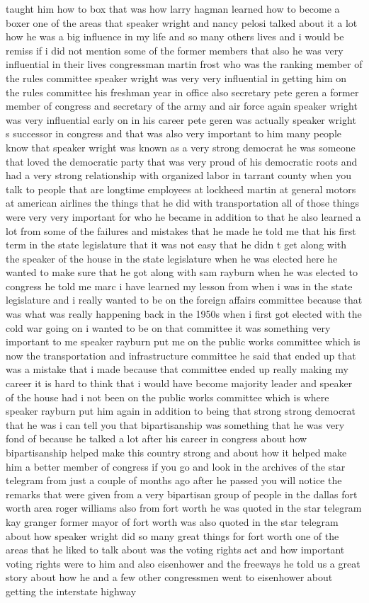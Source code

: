 \documentclass{article}
\begin{document}
taught him how to box that was how larry hagman learned how to become a boxer one of the areas that speaker wright and nancy pelosi talked about it a lot how he was a big influence in my life and so many others lives and i would be remiss if i did not mention some of the former members that also he was very influential in their lives congressman martin frost who was the ranking member of the rules committee speaker wright was very very influential in getting him on the rules committee his freshman year in office also secretary pete geren a former member of congress and secretary of the army and air force again speaker wright was very influential early on in his career pete geren was actually speaker wright s successor in congress and that was also very important to him many people know that speaker wright was known as a very strong democrat he was someone that loved the democratic party that was very proud of his democratic roots and had a very strong relationship with organized labor in tarrant county when you talk to people that are longtime employees at lockheed martin at general motors at american airlines the things that he did with transportation all of those things were very very important for who he became in addition to that he also learned a lot from some of the failures and mistakes that he made he told me that his first term in the state legislature that it was not easy that he didn t get along with the speaker of the house in the state legislature when he was elected here he wanted to make sure that he got along with sam rayburn when he was elected to congress he told me marc i have learned my lesson from when i was in the state legislature and i really wanted to be on the foreign affairs committee because that was what was really happening back in the 1950s when i first got elected with the cold war going on i wanted to be on that committee it was something very important to me speaker rayburn put me on the public works committee which is now the transportation and infrastructure committee he said that ended up that was a mistake that i made because that committee ended up really making my career it is hard to think that i would have become majority leader and speaker of the house had i not been on the public works committee which is where speaker rayburn put him again in addition to being that strong strong democrat that he was i can tell you that bipartisanship was something that he was very fond of because he talked a lot after his career in congress about how bipartisanship helped make this country strong and about how it helped make him a better member of congress if you go and look in the archives of the star telegram from just a couple of months ago after he passed you will notice the remarks that were given from a very bipartisan group of people in the dallas fort worth area roger williams also from fort worth he was quoted in the star telegram kay granger former mayor of fort worth was also quoted in the star telegram about how speaker wright did so many great things for fort worth one of the areas that he liked to talk about was the voting rights act and how important voting rights were to him and also eisenhower and the freeways he told us a great story about how he and a few other congressmen went to eisenhower about getting the interstate highway 
\end{document}
